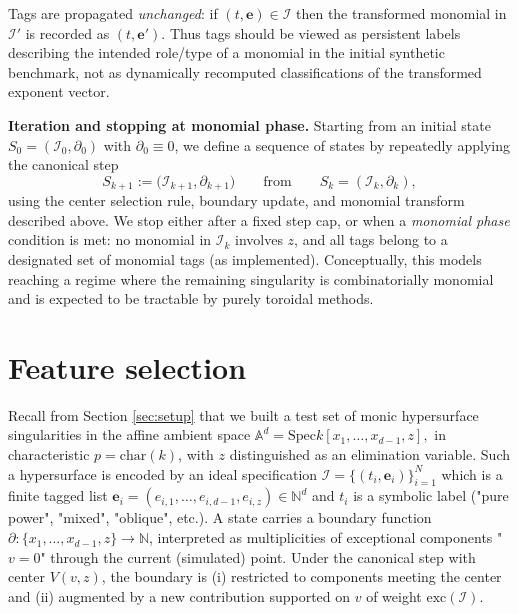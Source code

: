 \documentclass[11pt]{amsart}
\begin{document}
Tags are propagated \emph{unchanged}: if $(t,\mathbf{e})\in\mathcal I$ then the transformed monomial in $\mathcal I'$ is recorded as $(t,\mathbf{e}')$.
Thus tags should be viewed as persistent labels describing the intended role/type of a monomial in the initial synthetic benchmark,
not as dynamically recomputed classifications of the transformed exponent vector.

\noindent \textbf{Iteration and stopping at monomial phase.}
Starting from an initial state $S_0=(\mathcal I_0,\partial_0)$ with $\partial_0\equiv 0$, we define a sequence
of states by repeatedly applying the canonical step
\[
S_{k+1} := \bigl(\mathcal I_{k+1},\partial_{k+1}\bigr)
\qquad\text{from}\qquad
S_k=(\mathcal I_k,\partial_k),
\]
using the center selection rule, boundary update, and monomial transform described above.
We stop either after a fixed step cap, or when a \emph{monomial phase} condition is met:
no monomial in $\mathcal I_k$ involves $z$, and all tags belong to a designated set of monomial tags
(as implemented).
Conceptually, this models reaching a regime where the remaining singularity is combinatorially monomial and is
expected to be tractable by purely toroidal methods.


\section{Feature selection} 
\label{sec:features}

Recall from Section \ref{sec:setup} that we built a test set of monic hypersurface singularities in the  affine ambient space
$\mathbb{A}^d=\mathrm{Spec} k[x_1,\dots,x_{d-1},z],
$
in characteristic $p=\mathrm{char}(k)$, with $z$ distinguished as an elimination variable.
Such a hypersurface is encoded by an ideal specification $\mathcal I=\{(t_i,\mathbf{e}_i)\}_{i=1}^N$ which is a finite tagged list 
$\mathbf{e}_i=(e_{i,1},\dots,e_{i,d-1},e_{i,z})\in\mathbb{N}^d$ and $t_i$ is a symbolic label ("pure power", "mixed",
"oblique", etc.). A state carries a boundary function $
\partial:\{x_1,\dots,x_{d-1},z\}\to \mathbb{N}$,
interpreted as multiplicities of exceptional components "$v=0$" through the current (simulated) point.
Under the canonical step with center $V(v,z)$, the boundary is (i) restricted to components meeting the center
and (ii) augmented by a new contribution supported on $v$ of weight $\mathrm{exc}(\mathcal I)$.
\end{document}
